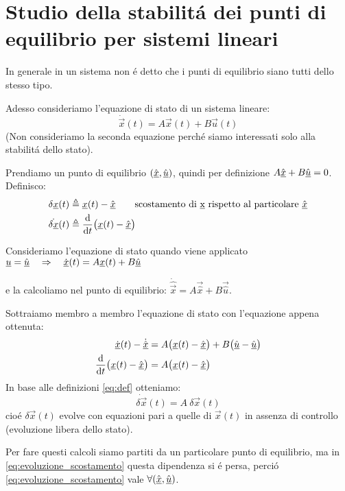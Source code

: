 \documentclass[../main.tex]{subfiles}
\begin{document}
	\section{Studio della stabilit\'a dei punti di equilibrio per sistemi lineari}
		In generale in un sistema non \'e detto che i punti di equilibrio siano tutti dello stesso tipo.
		
		Adesso consideriamo l'equazione di stato di un sistema lineare:
		\[ \dot{\vec{x}}(t) = A \vec x(t) + B\vec u(t) \]
		(Non consideriamo la seconda equazione perch\'e siamo interessati solo alla stabilit\'a dello stato).
		
		Prendiamo un punto di equilibrio $ (\hat{\underline x}, \hat{\underline u}) $, quindi per definizione $ A \hat{\underline x} + B \hat{\underline u} = 0 $. Definisco:
		\begin{align}
			\delta \underline x(t) &\triangleq \underline x(t) - \hat{\underline x} \qquad \text{scostamento di \underline x rispetto al particolare}\ \hat{\underline x}
			\\
			\dot{\delta \underline x}(t) &\triangleq \frac{\mathrm{d} }{\mathrm{d} t} \big( \underline x(t) - \hat{\underline x} \big)
			\label{eq:def}
		\end{align}
		
		Consideriamo l'equazione di stato quando viene applicato $ \underline u = \hat{\underline u} \quad\Rightarrow\quad \dot{\underline{x}}(t) = A \underline x(t) + B\underline{\hat u} $
		
		e la calcoliamo nel punto di equilibrio: $ \dot{\hat{\vec{x}}} = A \vec{\hat x} + B\vec{\hat u} $.
		
		Sottraiamo membro a membro l'equazione di stato con l'equazione appena ottenuta:
		\begin{align*}
			\dot{\underline{x}}(t) - \dot{\hat{\underline x}} &= A \big( \underline x(t) - \hat{\underline x} \big) + B \big( \hat{\underline u} - \hat{\underline u} \big)
			\\
			\frac{\mathrm{d} }{\mathrm{d} t} \big( \underline x(t) - \hat{\underline x} \big) &= A \big( \underline x(t) - \hat{\underline x} \big)
		\end{align*}
		In base alle definizioni \ref{eq:def} otteniamo:
		\begin{equation}
			\dot{\delta \vec x}(t) = A\ \delta \vec x(t)
			\label{eq:evoluzione_scostamento}
		\end{equation}
		cio\'e $ \delta \vec x(t) $ evolve con equazioni pari a quelle di $ \vec x(t) $ in assenza di controllo (evoluzione libera dello stato).
		
		Per fare questi calcoli siamo partiti da un particolare punto di equilibrio, ma in \ref{eq:evoluzione_scostamento} questa dipendenza si \'e persa, perci\'o \ref{eq:evoluzione_scostamento} vale $ \forall (\hat{\underline x}, \hat{\underline u}) $. 
		
\end{document}
